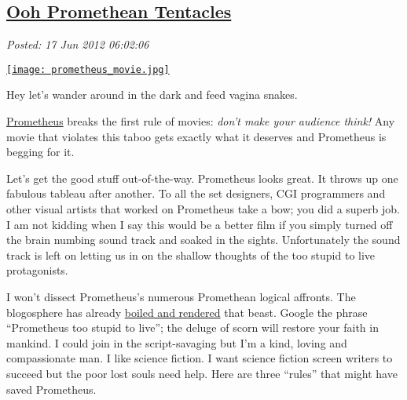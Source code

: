 %

\subsection*{\href{http://bakerjd99.wordpress.com/2012/06/17/ooh-promethean-tentacles/}{Ooh Promethean Tentacles}}


\noindent\emph{Posted: 17 Jun 2012 06:02:06}
\vspace{6pt}



\captionsetup[floatingfigure]{labelformat=empty}
\begin{floatingfigure}[r]{0.35\textwidth}
\centering
\href{http://www.prometheus-movie.com/}{\texttt{[image: prometheus\_movie.jpg]}}
\caption{Hey let's wander around in the dark and feed vagina snakes.}
\label{fig:2950X0}
\end{floatingfigure} \href{http://www.prometheus-movie.com/}{Prometheus} breaks the first
rule of movies: \emph{don't make your audience think!} Any movie that
violates this taboo gets exactly what it deserves and Prometheus is
begging for it.

Let's get the good stuff out-of-the-way. Prometheus looks great. It
throws up one fabulous tableau after another. To all the set designers,
CGI programmers and other visual artists that worked on Prometheus take
a bow; you did a superb job. I am not kidding when I say this would be a
better film if you simply turned off the brain numbing sound track and
soaked in the sights. Unfortunately the sound track is left on letting
us in on the shallow thoughts of the too stupid to live protagonists.

I won't dissect Prometheus's numerous Promethean logical affronts. The
blogosphere has already
\href{http://m15m.livejournal.com/23209.html}{boiled and rendered} that
beast. Google the phrase ``Prometheus too stupid to live''; the deluge
of scorn will restore your faith in mankind. I could join in the
script-savaging but I'm a kind, loving and compassionate man. I like
science fiction. I want science fiction screen writers to succeed but
the poor lost souls need help. Here are three ``rules'' that might have
saved Prometheus.

